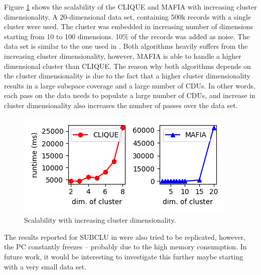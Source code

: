 Figure \ref{fig:cluster_dimensionality_vs_runtime} shows the scalability of the CLIQUE and MAFIA with increasing cluster dimensionality. A 20-dimensional data set, containing 500k records with a single cluster were used. The cluster was embedded in increasing number of dimensions starting from 10 to 100 dimensions. 10\% of the records was added as noise. The data set is similar to the one used in \cite{mafia}. Both algorithms heavily suffers from the increasing cluster dimensionality, however, MAFIA is able to handle a higher dimensional cluster than CLIQUE. The reason why both algorithms depends on the cluster dimensionality is due to the fact that a higher cluster dimensionality results in a large subspace coverage and a large number of CDUs. In other words, each pass on the data needs to populate a large number of CDUs, and increase in cluster dimensionality also increases the number of passes over the data set.
\begin{figure}[H]
    \vspace*{-0.5cm}
    \centering
    \includegraphics[scale=0.45]{figures/cluster_dimensionality_vs_runtime.png}
    \caption{Scalability with increasing cluster dimensionality.}
    \label{fig:cluster_dimensionality_vs_runtime}
    \vspace*{-0.5cm}
\end{figure}

The results reported for SUBCLU in \cite{subclu} were also tried to be replicated, however, the PC constantly freezes -- probably due to the high memory consumption. In future work, it would be interesting to investigate this further maybe starting with a very small data set.

